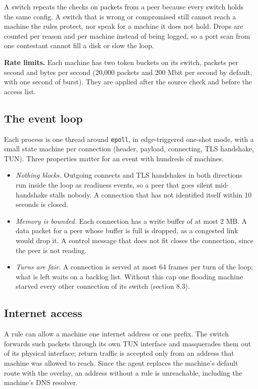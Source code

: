 \documentclass[11pt,a4paper]{article}
\providecommand{\tightlist}{\setlength{\itemsep}{0pt}\setlength{\parskip}{0pt}}
\begin{document}
A switch repeats the checks on packets from a peer because every switch holds the same config. A switch that is wrong or compromised still cannot reach a machine the rules protect, nor speak for a machine it does not hold. Drops are counted per reason and per machine instead of being logged, so a port scan from one contestant cannot fill a disk or slow the loop.

\textbf{Rate limits.} Each machine has two token buckets on its switch, packets per second and bytes per second (20,000 packets and 200 Mbit per second by default, with one second of burst). They are applied after the source check and before the access list.

\hypertarget{the-event-loop}{%
\subsection{The event loop}\label{the-event-loop}}

Each process is one thread around \texttt{epoll}, in edge-triggered one-shot mode, with a small state machine per connection (header, payload, connecting, TLS handshake, TUN). Three properties matter for an event with hundreds of machines.

\begin{itemize}
\tightlist
\item
  \emph{Nothing blocks.} Outgoing connects and TLS handshakes in both directions run inside the loop as readiness events, so a peer that goes silent mid-handshake stalls nobody. A connection that has not identified itself within 10 seconds is closed.
\item
  \emph{Memory is bounded.} Each connection has a write buffer of at most 2 MB. A data packet for a peer whose buffer is full is dropped, as a congested link would drop it. A control message that does not fit closes the connection, since the peer is not reading.
\item
  \emph{Turns are fair.} A connection is served at most 64 frames per turn of the loop; what is left waits on a backlog list. Without this cap one flooding machine starved every other connection of its switch (section 8.3).
\end{itemize}

\hypertarget{internet-access}{%
\subsection{Internet access}\label{internet-access}}

A rule can allow a machine one internet address or one prefix. The switch forwards such packets through its own TUN interface and masquerades them out of its physical interface; return traffic is accepted only from an address that machine was allowed to reach. Since the agent replaces the machine's default route with the overlay, an address without a rule is unreachable, including the machine's DNS resolver.
\end{document}
